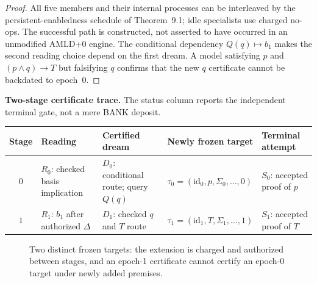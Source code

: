 \documentclass[11pt]{article}
\begin{document}
\begin{proof}
All five members and their internal processes can be interleaved by the persistent-enabledness schedule of Theorem~9.1; idle specialists use charged no-ops. The successful path is constructed, not asserted to have occurred in an unmodified AMLD+0 engine. The conditional dependency $Q(q)\mapsto b_1$ makes the second reading choice depend on the first dream. A model satisfying $p$ and $(p\land q)\to T$ but falsifying $q$ confirms that the new $q$ certificate cannot be backdated to epoch~0.
\end{proof}
\noindent\textbf{Two-stage certificate trace.} The status column reports the independent terminal gate, not a mere BANK deposit.
\begin{center}\small
\begin{tabular}{@{}c p{.12\linewidth} p{.22\linewidth} p{.22\linewidth} p{.20\linewidth}@{}}\toprule
Stage & Reading & Certified dream & Newly frozen target & Terminal attempt\\\midrule
$0$ & $R_0$: checked basis implication & $D_0$: conditional route; query $Q(q)$ & $\tau_0=(\mathrm{id}_0,p,\Sigma_0,\ldots,0)$ & $S_0$: accepted proof of $p$\\
$1$ & $R_1$: $b_1$ after authorized $\Delta$ & $D_1$: checked $q$ and $T$ route & $\tau_1=(\mathrm{id}_1,T,\Sigma_1,\ldots,1)$ & $S_1$: accepted proof of $T$\\\bottomrule
\end{tabular}
\end{center}
\begin{figure}[htbp]
\centering
{}
\caption{Two distinct frozen targets: the extension is charged and authorized between stages, and an epoch-1 certificate cannot certify an epoch-0 target under newly added premises.}
\end{figure}
\end{document}
